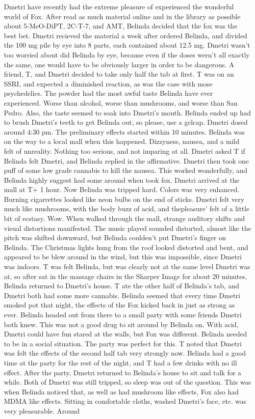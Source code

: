 \documentclass[12pt]{book}
\begin{document}
Dmetri have recently had the extreme pleasure of experienced the wonderful world of Fox. After read as much material online and in the library as possible about 5-MeO-DiPT, 2C-T-7, and AMT, Belinda decided that the fox was the best bet. Dmetri recieved the material a week after ordered Belinda, and divided the 100 mg pile by eye into 8 parts, each contained about 12.5 mg. Dmetri wasn't too worried about did Belinda by eye, because even if the doses wern't all exactly the same, one would have to be obviously larger in order to be dangerous. A friend, T, and Dmetri decided to take only half the tab at first. T was on an SSRI, and expected a diminished reaction, as was the case with mose psychedelics. The powder had the most awful taste Belinda have ever experienced. Worse than alcohol, worse than mushrooms, and worse than San Pedro. Also, the taste seemed to soak into Dmetri's mouth. Belinda ended up had to brush Dmetri's teeth to get Belinda out, so please, use a gelcap. Dmetri dosed around 4:30 pm. The preliminary effects started within 10 minutes. Belinda was on the way to a local mall when this happened. Dizzyness, nausea, and a mild felt of unreality. Nothing too serious, and not imparing at all. Dmetri asked T if Belinda felt Dmetri, and Belinda replied in the affirmative. Dmetri then took one puff of some low grade cannabis to kill the nausea. This worked wonderfully, and Belinda highly suggest had some around when took fox. Dmetri arrived at the mall at T+ 1 hour. Now Belinda was tripped hard. Colors was very enhanced. Burning cigarrettes looked like neon bulbs on the end of sticks. Dmetri felt very much like mushrooms, with the body buzz of acid, and thepleasure' felt of a little bit of ecstasy. Wow. When walked through the mall, strange auditory shifts and visual distortions manifested. The music played sounded distorted, almost like the pitch was shifted downward, but Belinda coulden't put Dmetri's finger on Belinda. The Christmas lights hung from the roof looked distorted and bent, and appeared to be blew around in the wind, but this was impossible, since Dmetri was indoors. T was felt Belinda, but was clearly not at the same level Dmetri was at, so after sat in the massage chairs in the Sharper Image for about 20 minutes, Belinda returned to Dmetri's house. T ate the other half of Belinda's tab, and Dmetri both had some more cannabis. Belinda seemed that every time Dmetri smoked pot that night, the effects of the Fox kicked back in just as strong as ever. Belinda headed out from there to a small party with some friends Dmetri both knew. This was not a good drug to sit around by Belinda on. With acid, Dmetri could have fun stared at the walls, but Fox was different. Belinda needed to be in a social situation. The party was perfect for this. T noted that Dmetri was felt the effects of the second half tab very strongly now. Belinda had a good time at the party for the rest of the night, and T had a few drinks with no ill effect. After the party, Dmetri returned to Belinda's house to sit and talk for a while. Both of Dmetri was still tripped, so sleep was out of the question. This was when Belinda noticed that, as well as had mushroom like effects, Fox also had MDMA like effects. Sitting in comfortable cloths, washed Dmetri's face, etc. was very pleasurable. Around 
\end{document}
